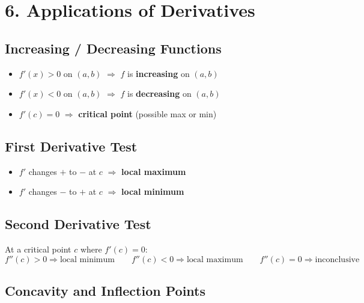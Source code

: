 \documentclass[12pt]{article}
\begin{document}
\section{6. Applications of Derivatives}

\subsection{Increasing / Decreasing Functions}

\begin{itemize}[leftmargin=16pt]
  \item $f'(x) > 0$ on $(a,b)$ $\Rightarrow$ $f$ is \textbf{increasing} on $(a,b)$
  \item $f'(x) < 0$ on $(a,b)$ $\Rightarrow$ $f$ is \textbf{decreasing} on $(a,b)$
  \item $f'(c) = 0$ $\Rightarrow$ \textbf{critical point} (possible max or min)
\end{itemize}

\subsection{First Derivative Test}

\begin{itemize}[leftmargin=16pt]
  \item $f'$ changes $+$ to $-$ at $c$ $\Rightarrow$ \textbf{local maximum}
  \item $f'$ changes $-$ to $+$ at $c$ $\Rightarrow$ \textbf{local minimum}
\end{itemize}

\subsection{Second Derivative Test}

\begin{formulabox}
At a critical point $c$ where $f'(c)=0$:
\[
  f''(c) > 0 \Rightarrow \text{local minimum} \qquad
  f''(c) < 0 \Rightarrow \text{local maximum} \qquad
  f''(c) = 0 \Rightarrow \text{inconclusive}
\]
\end{formulabox}

\subsection{Concavity and Inflection Points}
\end{document}
